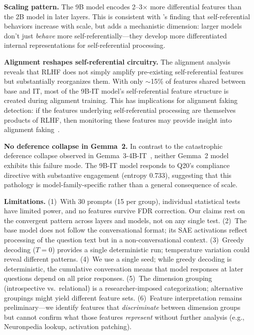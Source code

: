 \documentclass{article}
\begin{document}
\textbf{Scaling pattern.}
The 9B model encodes 2--3$\times$ more differential features than the 2B model in later layers.
This is consistent with \citet{perez2023discovering}'s finding that self-referential behaviors increase with scale, but adds a mechanistic dimension: larger models don't just \emph{behave} more self-referentially---they develop more differentiated internal representations for self-referential processing.

\textbf{Alignment reshapes self-referential circuitry.}
The alignment analysis reveals that RLHF does not simply amplify pre-existing self-referential features but substantially reorganizes them.
With only $\sim$15\% of features shared between base and IT, most of the 9B-IT model's self-referential feature structure is created during alignment training.
This has implications for alignment faking detection: if the features underlying self-referential processing are themselves products of RLHF, then monitoring these features may provide insight into alignment faking~\citep{greenblatt2024alignment}.

\textbf{No deference collapse in Gemma~2.}
In contrast to the catastrophic deference collapse observed in Gemma~3-4B-IT~\citep{gemmateam2025gemma3}, neither Gemma~2 model exhibits this failure mode.
The 9B-IT model responds to Q20's compliance directive with substantive engagement (entropy 0.733), suggesting that this pathology is model-family-specific rather than a general consequence of scale.

\textbf{Limitations.}
(1)~With 30 prompts (15 per group), individual statistical tests have limited power, and no features survive FDR correction.
Our claims rest on the convergent pattern across layers and models, not on any single test.
(2)~The base model does not follow the conversational format; its SAE activations reflect processing of the question text but in a non-conversational context.
(3)~Greedy decoding ($T{=}0$) provides a single deterministic run; temperature variation could reveal different patterns.
(4)~We use a single seed; while greedy decoding is deterministic, the cumulative conversation means that model responses at later questions depend on all prior responses.
(5)~The dimension grouping (introspective vs.\ relational) is a researcher-imposed categorization; alternative groupings might yield different feature sets.
(6)~Feature interpretation remains preliminary---we identify features that \emph{discriminate} between dimension groups but cannot confirm what those features \emph{represent} without further analysis (e.g., Neuronpedia lookup, activation patching).
\end{document}
